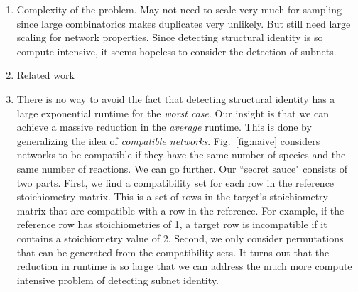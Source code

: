 \documentclass{article}
\newcommand{\fig}[1]{Fig.~\ref{#1}}
\begin{document}
\begin{enumerate}
\begin{enumerate}
        \item \fig{fig:naive} displays pseudo code for a naive algorithm for detecting structurally identical CRNs. The first step is to check if the reference and target networks are compatible in that they have the same number of species and the same number of reactions. Such a mismatch is detected with little computational cost. The second step is to search all permutations of species and all permutations of reactions to see if any permutation results in target stoichiometry matrices that are identical to those of the reference network. This is extremely compute intensive because of the large number of possible permutations. Indeed, to compare two networks with 50 species and 50 reactions, the number of permutations  ($50!\times 50!$) is larger than the number of atoms in the universe ($\approx 10^{100}$).
    \end{enumerate}
    
    \item Complexity of the problem. May not need to scale very much for sampling since large combinatorics makes duplicates very unlikely. But still need large scaling for network properties. Since detecting structural identity is so compute intensive, it seems hopeless to consider the detection of subnets.
    
    \item Related work
    
    \item  There is no way to avoid the fact that detecting structural identity has a large exponential runtime for the {\em worst case}.
    Our insight is that we can achieve a massive reduction in the {\em average} runtime. This is done by generalizing the idea of {\em compatible networks}. \fig{fig:naive} considers networks to be compatible if they have the same number of species and the same number of reactions.
    We can go further. Our ``secret sauce" consists of two parts. First, we find a compatibility set for each row in the reference stoichiometry matrix. This is a set of rows in the target's stoichiometry matrix that are compatible with a row in the reference. For example, if the reference row has stoichiometries of 1, a target row is incompatible if it contains a stoichiometry value of 2. Second, we only consider permutations that can be generated from the compatibility sets. It turns out that the reduction in runtime is so large that we can address the much more compute intensive problem of detecting subnet identity.
\end{enumerate}
\end{document}
